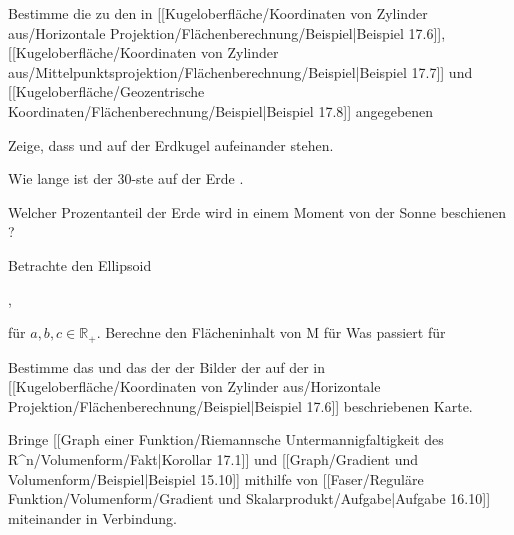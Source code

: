 {}
{

Bestimme die
 {} {}
zu den in
[[Kugeloberfläche/Koordinaten von Zylinder aus/Horizontale Projektion/Flächenberechnung/Beispiel|Beispiel 17.6]],
[[Kugeloberfläche/Koordinaten von Zylinder aus/Mittelpunktsprojektion/Flächenberechnung/Beispiel|Beispiel 17.7]]
und
[[Kugeloberfläche/Geozentrische Koordinaten/Flächenberechnung/Beispiel|Beispiel 17.8]]
angegebenen

}
{} {}

{}
{

Zeige, dass
und
auf der Erdkugel
aufeinander stehen.

}
{} {}

{}
{

Wie lange ist der $30$-ste
 auf der Erde
 {} {.}

}
{} {}

{}
{

Welcher Prozentanteil der Erde wird in einem Moment von der Sonne beschienen
 {} {?}

}
{} {}

{}
{

Betrachte den Ellipsoid

 { , }

für $a,b,c\in\mathbb{R}_{+}$. Berechne den Flächeninhalt von M für
 Was passiert für

}
{} {}

{}
{

Bestimme das
und das
der
der Bilder der
auf der in
[[Kugeloberfläche/Koordinaten von Zylinder aus/Horizontale Projektion/Flächenberechnung/Beispiel|Beispiel 17.6]]
beschriebenen Karte.

}
{} {}

{}
{

Bringe
[[Graph einer Funktion/Riemannsche Untermannigfaltigkeit des R^n/Volumenform/Fakt|Korollar 17.1]]
und
[[Graph/Gradient und Volumenform/Beispiel|Beispiel 15.10]]
mithilfe von
[[Faser/Reguläre Funktion/Volumenform/Gradient und Skalarprodukt/Aufgabe|Aufgabe 16.10]]
miteinander in Verbindung.

}
{} {}


